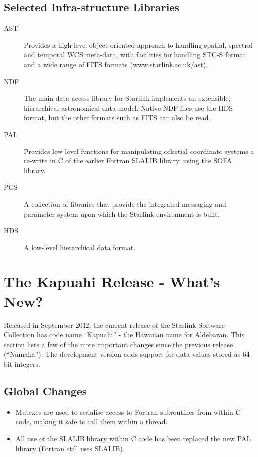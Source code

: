 \documentclass[11pt,twoside]{article}
\begin{document}
\subsection{Selected Infra-structure Libraries}
\begin{description}
\item[AST] Provides a high-level object-oriented approach to handling
spatial, spectral and temporal WCS meta-data, with facilities for
handling STC-S format and a wide range of FITS formats
(\url{www.starlink.ac.uk/ast}).

\item[NDF] The main data access library for Starlink-implements an extensible, hierarchical astronomical data model. Native NDF files use the HDS format, but the other formats such as FITS can also be read.
\item[PAL] Provides low-level functions for manipulating celestial coordinate systems-a re-write in C of the earlier Fortran SLALIB library, using the SOFA library.
\item[PCS] A collection of libraries that provide the integrated messaging and parameter system upon which the Starlink environment is built.
\item[HDS] A low-level hierarchical data format.
\end{description}

\section{The Kapuahi Release - What's New?}
Released in September 2012, the current release of the Starlink Software
Collection has code name ``Kapuahi'' - the Hawaiian name for Aldebaran.
This section lists a few of the more important changes since the previous
release (``Namaka''). The development version adds support for data values
stored as 64-bit integers.

\subsection{Global Changes}
\begin{itemize}
\item Mutexes are used to serialise access to Fortran subroutines from within
C code, making it safe to call them within a thread.
\item All use of the SLALIB library within C code has been replaced the new
PAL library (Fortran still uses SLALIB).
\end{itemize}
\end{document}
